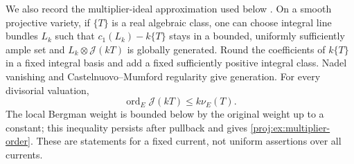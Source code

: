 \documentclass[11pt,letterpaper]{article}
\DeclareMathOperator{\ord}{ord}
\theoremstyle{definition}
\theoremstyle{remark}
\begin{document}
We also record the multiplier-ideal approximation used below
\cite[Theorems~5.11, 6.27, and 14.2]{Proj-Demailly2012}. On a smooth projective variety, if \(\{T\}\)
is a real algebraic class, one can choose integral line bundles
\(L_k\) such that \(c_1(L_k)-k\{T\}\) stays in a bounded,
uniformly sufficiently ample set and
\(L_k\otimes\mathcal J(kT)\) is globally generated. Round the
coefficients of \(k\{T\}\) in a fixed integral basis and add a
fixed sufficiently positive integral class. Nadel vanishing and
Castelnuovo--Mumford regularity give generation. For every
divisorial valuation,
\begin{equation}\label{proj:ex:multiplier-order}
 \ord_E\mathcal J(kT)\leq k\nu_E(T).
\end{equation}
The local Bergman weight is bounded below by the original weight
up to a constant; this inequality persists after pullback and
gives \eqref{proj:ex:multiplier-order}. These are statements for a
fixed current, not uniform assertions over all currents.
\end{document}
